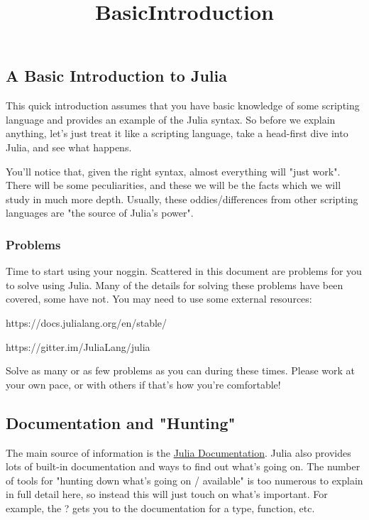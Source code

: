 \documentclass[11pt]{article}
\title{BasicIntroduction}
\begin{document}
    
    
    \maketitle
    
    

    
    \subsection{A Basic Introduction to
Julia}\label{a-basic-introduction-to-julia}

This quick introduction assumes that you have basic knowledge of some
scripting language and provides an example of the Julia syntax. So
before we explain anything, let's just treat it like a scripting
language, take a head-first dive into Julia, and see what happens.

You'll notice that, given the right syntax, almost everything will "just
work". There will be some peculiarities, and these we will be the facts
which we will study in much more depth. Usually, these
oddies/differences from other scripting languages are "the source of
Julia's power".

    \subsubsection{Problems}\label{problems}

Time to start using your noggin. Scattered in this document are problems
for you to solve using Julia. Many of the details for solving these
problems have been covered, some have not. You may need to use some
external resources:

https://docs.julialang.org/en/stable/

https://gitter.im/JuliaLang/julia

Solve as many or as few problems as you can during these times. Please
work at your own pace, or with others if that's how you're comfortable!

    \subsection{Documentation and
"Hunting"}\label{documentation-and-hunting}

The main source of information is the
\href{http://docs.julialang.org/en/latest/}{Julia Documentation}.
Julia also provides lots of built-in documentation and ways to find out
what's going on. The number of tools for "hunting down what's going on /
available" is too numerous to explain in full detail here, so instead
this will just touch on what's important. For example, the ? gets you to
the documentation for a type, function, etc.
\end{document}
